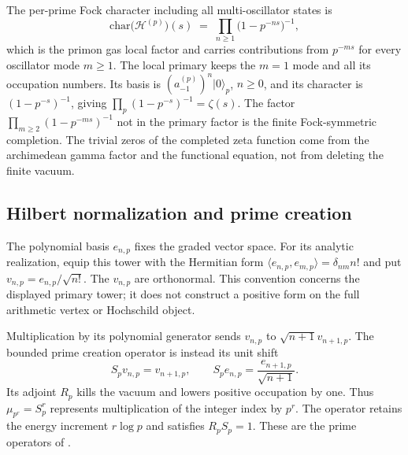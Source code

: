 \begin{remark}
\label{v4-arith:prim-zeta:rem:exclude-doubles}
The per-prime Fock character including all multi-oscillator states is
\begin{equation}
\mathrm{char}\bigl(\mathcal{H}^{(p)}\bigr)(s)\;=\;\prod_{n\geq 1}\bigl(1-p^{-ns}\bigr)^{-1},
\end{equation}
which is the primon gas local factor and carries contributions from
\(p^{-ms}\) for every oscillator mode \(m\geq1\). The local primary
keeps the \(m=1\) mode and all its occupation numbers. Its basis is
\((a^{(p)}_{-1})^{n}|0\rangle_{p}\), \(n\geq0\), and its character is
\((1-p^{-s})^{-1}\), giving \(\prod_{p}(1-p^{-s})^{-1}=\zeta(s)\). The
factor \(\prod_{m\geq2}(1-p^{-ms})^{-1}\) not in the primary factor is
the finite Fock-symmetric completion.  The trivial zeros of the
completed zeta function come from the archimedean gamma factor and
the functional equation, not from deleting the finite vacuum.
\end{remark}

\subsection{Hilbert normalization and prime creation}
\label{v4-arith:prim-zeta:hilbert-normalization}

The polynomial basis $e_{n,p}$ fixes the graded vector space. For
its analytic realization, equip this tower with the Hermitian
form $\langle e_{n,p},e_{m,p}\rangle=\delta_{nm}n!$ and put
$v_{n,p}=e_{n,p}/\sqrt{n!}$. The $v_{n,p}$ are orthonormal.
This convention concerns the displayed primary tower; it does
not construct a positive form on the full arithmetic vertex or
Hochschild object.

Multiplication by its polynomial generator sends
$v_{n,p}$ to $\sqrt{n+1}v_{n+1,p}$. The bounded prime creation
operator is instead its unit shift
\[
 S_pv_{n,p}=v_{n+1,p},\qquad
 S_pe_{n,p}=\frac{e_{n+1,p}}{\sqrt{n+1}}.
\]
Its adjoint $R_p$ kills the vacuum and lowers positive occupation
by one. Thus $\mu_{p^r}=S_p^r$ represents multiplication of the
integer index by $p^r$. The operator retains the energy increment
$r\log p$ and satisfies $R_pS_p=1$. These are the prime operators
of .


